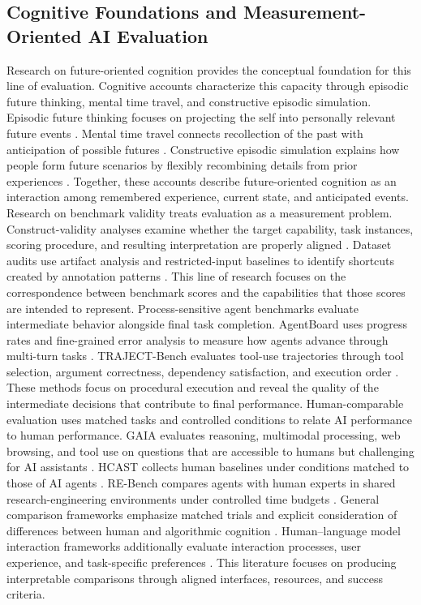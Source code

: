 \documentclass[pdflatex,sn-mathphys-num]{sn-jnl}%
\theoremstyle{thmstyleone}%
\theoremstyle{thmstyletwo}%
\theoremstyle{thmstylethree}%
\begin{document}
\subsection{Cognitive Foundations and Measurement-Oriented AI Evaluation}
Research on future-oriented cognition provides the conceptual foundation for this line of evaluation. Cognitive accounts characterize this capacity through episodic future thinking, mental time travel, and constructive episodic simulation. Episodic future thinking focuses on projecting the self into personally relevant future events \cite{atance2001episodic}. Mental time travel connects recollection of the past with anticipation of possible futures \cite{suddendorf2007evolution}. Constructive episodic simulation explains how people form future scenarios by flexibly recombining details from prior experiences \cite{schacter2007cognitive}. Together, these accounts describe future-oriented cognition as an interaction among remembered experience, current state, and anticipated events.
Research on benchmark validity treats evaluation as a measurement problem. Construct-validity analyses examine whether the target capability, task instances, scoring procedure, and resulting interpretation are properly aligned \cite{bean2025measuring}. Dataset audits use artifact analysis and restricted-input baselines to identify shortcuts created by annotation patterns \cite{gururangan2018annotation}. This line of research focuses on the correspondence between benchmark scores and the capabilities that those scores are intended to represent.
Process-sensitive agent benchmarks evaluate intermediate behavior alongside final task completion. AgentBoard uses progress rates and fine-grained error analysis to measure how agents advance through multi-turn tasks \cite{ma2024agentboard}. TRAJECT-Bench evaluates tool-use trajectories through tool selection, argument correctness, dependency satisfaction, and execution order \cite{he2025trajectbencha}. These methods focus on procedural execution and reveal the quality of the intermediate decisions that contribute to final performance.
Human-comparable evaluation uses matched tasks and controlled conditions to relate AI performance to human performance. GAIA evaluates reasoning, multimodal processing, web browsing, and tool use on questions that are accessible to humans but challenging for AI assistants \cite{mialon2023gaia}. HCAST collects human baselines under conditions matched to those of AI agents \cite{rein2025hcast}. RE-Bench compares agents with human experts in shared research-engineering environments under controlled time budgets \cite{wijk2024rebench}. General comparison frameworks emphasize matched trials and explicit consideration of differences between human and algorithmic cognition \cite{cowley2022framework}. Human--language model interaction frameworks additionally evaluate interaction processes, user experience, and task-specific preferences \cite{lee2022evaluating}. This literature focuses on producing interpretable comparisons through aligned interfaces, resources, and success criteria.
\end{document}
